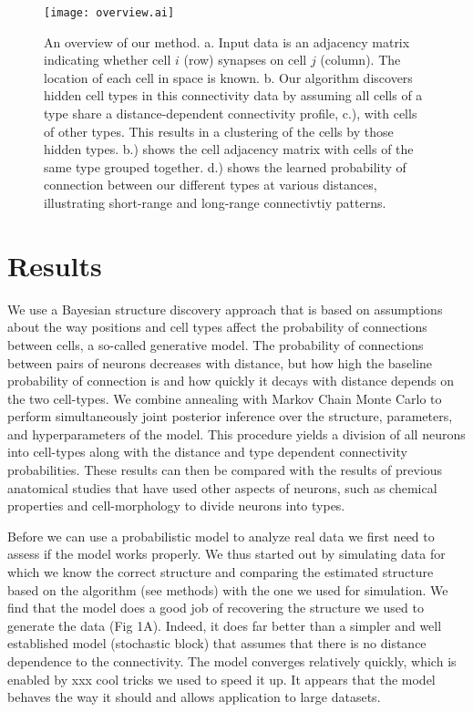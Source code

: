 \documentclass{article}
\begin{document}
\begin{figure}
  \centering 
    \centerline{\texttt{[image: overview.ai]}}
  \caption{An overview of our method. a. Input data is
an adjacency matrix indicating whether cell $i$ (row)
synapses on cell $j$ (column). The location of each cell in space is known. 
b. Our algorithm discovers hidden cell types in this connectivity data
by assuming all cells of a type share a distance-dependent connectivity 
profile, c.), with cells of other types. This results in a clustering 
of the cells by those hidden types. b.) shows the cell adjacency
matrix with cells of the same type grouped together. d.) shows
the learned probability of connection between our different types
at various distances, illustrating short-range and long-range
connectivtiy patterns.}

\end{figure}

\section{Results}
We use a Bayesian structure discovery approach that is based on
assumptions about the way positions and cell types affect the
probability of connections between cells, a so-called generative
model. The probability of connections between pairs of neurons
decreases with distance, but how high the baseline probability of
connection is and how quickly it decays with distance depends on the
two cell-types. We combine annealing with Markov Chain Monte Carlo to
perform simultaneously joint posterior inference over the structure,
parameters, and hyperparameters of the model. This procedure yields a
division of all neurons into cell-types along with the distance and
type dependent connectivity probabilities. These results can then be
compared with the results of previous anatomical studies that have
used other aspects of neurons, such as chemical properties and
cell-morphology to divide neurons into types.

Before we can use a probabilistic model to analyze real data we first
need to assess if the model works properly. We thus started out by
simulating data for which we know the correct structure and comparing
the estimated structure based on the algorithm (see methods) with the
one we used for simulation. We find that the model does a good job of
recovering the structure we used to generate the data (Fig
1A). Indeed, it does far better than a simpler and well established
model (stochastic block) that assumes that there is no distance
dependence to the connectivity. The model converges relatively
quickly, which is enabled by xxx cool tricks we used to speed it
up. It appears that the model behaves the way it should and allows
application to large datasets.
\end{document}
